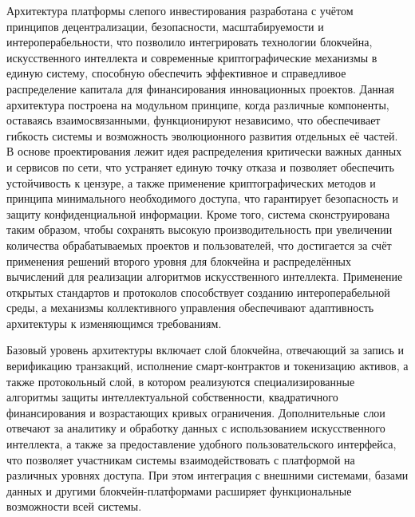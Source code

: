 \documentclass[
    14pt,
    specialist,
    candidate, %
    subf, %
    href,
    dotsinheaders=false
]{disser}
\begin{document}
Архитектура платформы слепого инвестирования разработана с учётом принципов децентрализации, безопасности, масштабируемости и интероперабельности, что позволило интегрировать технологии блокчейна, искусственного интеллекта и современные криптографические механизмы в единую систему, способную обеспечить эффективное и справедливое распределение капитала для финансирования инновационных проектов. Данная архитектура построена на модульном принципе, когда различные компоненты, оставаясь взаимосвязанными, функционируют независимо, что обеспечивает гибкость системы и возможность эволюционного развития отдельных её частей. В основе проектирования лежит идея распределения критически важных данных и сервисов по сети, что устраняет единую точку отказа и позволяет обеспечить устойчивость к цензуре, а также применение криптографических методов и принципа минимального необходимого доступа, что гарантирует безопасность и защиту конфиденциальной информации. Кроме того, система сконструирована таким образом, чтобы сохранять высокую производительность при увеличении количества обрабатываемых проектов и пользователей, что достигается за счёт применения решений второго уровня для блокчейна и распределённых вычислений для реализации алгоритмов искусственного интеллекта. Применение открытых стандартов и протоколов способствует созданию интероперабельной среды, а механизмы коллективного управления обеспечивают адаптивность архитектуры к изменяющимся требованиям.

Базовый уровень архитектуры включает слой блокчейна, отвечающий за запись и верификацию транзакций, исполнение смарт-контрактов и токенизацию активов, а также протокольный слой, в котором реализуются специализированные алгоритмы защиты интеллектуальной собственности, квадратичного финансирования и возрастающих кривых ограничения. Дополнительные слои отвечают за аналитику и обработку данных с использованием искусственного интеллекта, а также за предоставление удобного пользовательского интерфейса, что позволяет участникам системы взаимодействовать с платформой на различных уровнях доступа. При этом интеграция с внешними системами, базами данных и другими блокчейн-платформами расширяет функциональные возможности всей системы.
\end{document}
